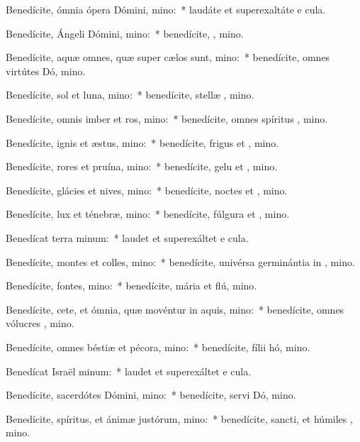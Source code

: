 \item Benedícite, ómnia ópera Dómini, mino:~* laudáte et superexaltáte e  cula.
\item Benedícite, Ángeli Dómini, mino:~* benedícite, , mino.
\item Benedícite, aquæ omnes, quæ super cælos sunt, mino:~* benedícite, omnes virtútes Dó, mino.
\item Benedícite, sol et luna, mino:~* benedícite, stellæ , mino.
\item Benedícite, omnis imber et ros, mino:~* benedícite, omnes spíritus , mino.
\item Benedícite, ignis et æstus, mino:~* benedícite, frigus et , mino.
\item Benedícite, rores et pruína, mino:~* benedícite, gelu et , mino.
\item Benedícite, glácies et nives, mino:~* benedícite, noctes et , mino.
\item Benedícite, lux et ténebræ, mino:~* benedícite, fúlgura et , mino.
\item Benedícat terra minum:~* laudet et superexáltet e  cula.
\item Benedícite, montes et colles, mino:~* benedícite, univérsa germinántia in , mino.
\item Benedícite, fontes, mino:~* benedícite, mária et flú, mino.
\item Benedícite, cete, et ómnia, quæ movéntur in aquis, mino:~* benedícite, omnes vólucres , mino.
\item Benedícite, omnes béstiæ et pécora, mino:~* benedícite, fílii hó, mino.
\item Benedícat Israël minum:~* laudet et superexáltet e  cula.
\item Benedícite, sacerdótes Dómini, mino:~* benedícite, servi Dó, mino.
\item Benedícite, spíritus, et ánimæ justórum, mino:~* benedícite, sancti, et húmiles , mino.
